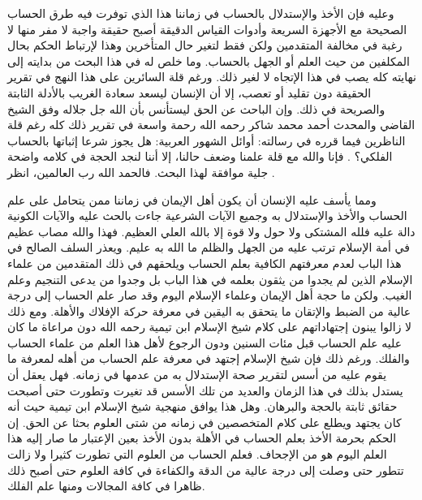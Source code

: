 وعليه فإن الأخذ والإستدلال بالحساب في زماننا هذا الذي توفرت فيه طرق الحساب الصحيحة مع الأجهزة السريعة وأدوات القياس الدقيقة أصبح حقيقة واجبة لا مفر منها لا رغبة في مخالفة المتقدمين ولكن فقط لتغير حال المتأخرين وهذا لإرتباط الحكم بحال المكلفين من حيث العلم أو الجهل بالحساب. وما خلص له في هذا البحث من بدايته إلى نهايته كله يصب في هذا الإتجاه لا لغير ذلك. ورغم قلة السائرين على هذا النهج في تقرير الحقيقة دون تقليد أو تعصب، إلا أن الإنسان ليسعد سعادة الغريب بالأدلة الثابتة والصريحة في ذلك. وإن الباحث عن الحق ليستأنس بأن الله جل جلاله وفق الشيخ القاضي والمحدث أحمد محمد شاكر رحمه الله رحمة واسعة في تقرير ذلك كله رغم قلة الناظرين فيما قرره في رسالته: أوائل الشهور العربية: هل يجوز شرعا إثباتها بالحساب الفلكي؟ \cite{shuhur_ahmidShakir}. فإنا والله مع قلة علمنا وضعف حالنا، إلا أننا  لنجد الحجة في كلامه واضحة جلية موافقة لهذا البحث. فالحمد الله رب العالمين، انظر .

ومما يأسف عليه الإنسان أن يكون أهل الإيمان في زماننا ممن يتحامل على علم الحساب والأخذ والإستدلال به وجميع الآيات الشرعية جاءت بالحث عليه والآيات الكونية دالة عليه فلله المشتكى ولا حول ولا قوة إلا بالله العلي العظيم. فهذا والله مصاب عظيم في أمة الإسلام ترتب عليه من الجهل والظلم ما الله به عليم. ويعذر السلف الصالح في هذا الباب لعدم معرفتهم الكافية بعلم الحساب ويلحقهم في ذلك المتقدمين من علماء الإسلام الذين لم يجدوا من يثقون بعلمه في هذا الباب بل وجدوا من يدعى التنجيم وعلم الغيب. ولكن ما حجة أهل الإيمان وعلماء الإسلام اليوم وقد صار علم الحساب إلى درجة عالية من الضبط والإتقان ما يتحقق به اليقين في معرفة حركة الإفلاك والأهلة. ومع ذلك لا زالوا يبنون إجتهاداتهم على كلام شيخ الإسلام ابن تيمية رحمه الله دون مراعاة ما كان عليه علم الحساب قبل مئات السنين ودون الرجوع لأهل هذا العلم من علماء الحساب والفلك. ورغم ذلك فإن شيخ الإسلام إجتهد في معرفة علم الحساب من أهله لمعرفة ما يقوم عليه من أسس لتقرير صحة الإستدلال به من عدمها في زمانه. فهل يعقل أن يستدل بذلك في هذا الزمان والعديد من تلك الأسس قد تغيرت وتطورت حتى أصبحت حقائق ثابتة بالحجة والبرهان. وهل هذا يوافق منهجية شيخ الإسلام ابن تيمية حيث أنه كان يجتهد ويطلع على كلام المتخصصين في زمانه من شتى العلوم بحثا عن الحق. إن الحكم بحرمة الأخذ بعلم الحساب في الأهلة بدون الأخذ بعين الإعتبار ما صار إليه هذا العلم اليوم هو من الإجحاف. فعلم الحساب من العلوم التي تطورت كثيرا ولا زالت تتطور حتى وصلت إلى درجة عالية من الدقة والكفاءة في كافة العلوم حتى أصبح ذلك ظاهرا في كافة المجالات ومنها علم الفلك.

